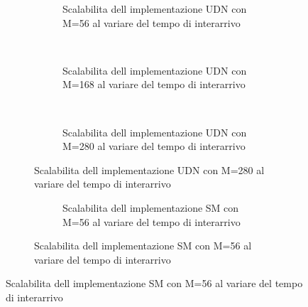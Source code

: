 \documentclass[a4paper]{article}
\begin{document}
\begin{figure}[!h]
  \caption{Grafici di scalabilit\`a al variare del tempo di interarrivo}
  \begin{subfigure}[b]{.5\columnwidth}
    \centering
    \renewcommand\thesubfigure{\alph{subfigure}}
    \caption{Implementazione con solo UDN}
    \begin{subfigure}[b]{\textwidth}
      \centering
      \addtocounter{subfigure}{-1}
      \renewcommand\thesubfigure{\alph{subfigure}1}
      \resizebox{\columnwidth}{!}{}
      \caption{Scalabilita dell implementazione UDN con M=56 al variare del tempo di interarrivo}
      \label{fig:scalability_UDN_size56}
    \end{subfigure}
    ~
    \begin{subfigure}[b]{\textwidth}
      \centering
      \addtocounter{subfigure}{-1}
      \renewcommand\thesubfigure{\alph{subfigure}2}
      \resizebox{\columnwidth}{!}{}
      \caption{Scalabilita dell implementazione UDN con M=168 al variare del tempo di interarrivo}
      \label{fig:scalability_UDN_size168}
    \end{subfigure}
    ~
    \begin{subfigure}[b]{\textwidth}
      \centering
      \addtocounter{subfigure}{-1}
      \renewcommand\thesubfigure{\alph{subfigure}3}
      \resizebox{\columnwidth}{!}{}
      \caption{Scalabilita dell implementazione UDN con M=280 al variare del tempo di interarrivo}
      \label{fig:scalability_UDN_size280}
    \end{subfigure}
    \label{fig:allScalbility_UDN}
  \end{subfigure}
  \hspace{2ex}
  \begin{subfigure}[b]{.5\columnwidth}
    \centering
    \renewcommand\thesubfigure{\alph{subfigure}}
    \caption{Implementazione con solo SM}
    \begin{subfigure}[b]{\textwidth}
      \centering
      \addtocounter{subfigure}{-1}
      \renewcommand\thesubfigure{\alph{subfigure}1}
      \resizebox{\columnwidth}{!}{}
      \caption{Scalabilita dell implementazione SM con M=56 al variare del tempo di interarrivo}
      \label{fig:scalability_SM_size56}
    \end{subfigure}

\end{subfigure}
\end{figure}
\end{document}
